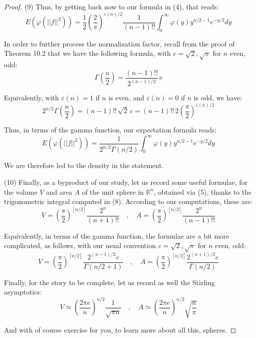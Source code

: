 \documentclass[10pt,a4paper]{amsart}
\begin{document}
\begin{proof}
(9) Thus, by getting back now to our formula in (4), that reads:
$$E\left(\varphi(||f||^2)\right)
=\frac{1}{2}\left(\frac{2}{\pi}\right)^{\varepsilon(n)/2}\frac{1}{(n-1)!!}\int_0^\infty\varphi(y)y^{n/2-1}e^{-y/2}dy$$

In order to further process the normalization factor, recall from the proof of Theorem 10.2 that we have the following formula, with $c=\sqrt{2},\sqrt{\pi}$ for $n$ even, odd:
$$\Gamma\left(\frac{n}{2}\right)=\frac{(n-1)!!}{2^{(n-1)/2}}\,c$$

Equivalently, with $\varepsilon(n)=1$ if $n$ is even, and $\varepsilon(n)=0$ if $n$ is odd, we have:
$$2^{n/2}\Gamma\left(\frac{n}{2}\right)=(n-1)!!\,\sqrt{2}\,c=(n-1)!!\,2\left(\frac{\pi}{2}\right)^{\varepsilon(n)/2}$$

Thus, in terms of the gamma function, our expectation formula reads:
$$E\left(\varphi(||f||^2)\right)=\frac{1}{2^{n/2}\Gamma(n/2)}\int_0^\infty\varphi(y)y^{n/2-1}e^{-y/2}dy$$

We are therefore led to the density in the statement.

\medskip

(10) Finally, as a byproduct of our study, let us record some useful formulae, for the volume $V$ and area $A$ of the unit sphere in $\mathbb R^n$, obtained via (5), thanks to the trigonometric integral computed in (8). According to our computations, these are:
$$V=\left(\frac{\pi}{2}\right)^{[n/2]}\frac{2^n}{(n+1)!!}\quad,\quad 
A=\left(\frac{\pi}{2}\right)^{[n/2]}\frac{2^n}{(n-1)!!}$$

Equivalently, in terms of the gamma function, the formulae are a bit more complicated, as follows, with our usual convention $c=\sqrt{2},\sqrt{\pi}$ for $n$ even, odd:
$$V=\left(\frac{\pi}{2}\right)^{[n/2]}\frac{2^{(n-1)/2}c}{\Gamma(n/2+1)}\quad,\quad 
A=\left(\frac{\pi}{2}\right)^{[n/2]}\frac{2^{(n+1)/2}c}{\Gamma(n/2)}$$

Finally, for the story to be complete, let us record as well the Stirling asymptotics:
$$V\simeq\left(\frac{2\pi e}{n}\right)^{n/2}\frac{1}{\sqrt{\pi n}}
\quad,\quad A\simeq\left(\frac{2\pi e}{n}\right)^{n/2}\sqrt{\frac{n}{\pi}}$$

And with of course exercise for you, to learn more about all this, spheres.
\end{proof}
\end{document}
